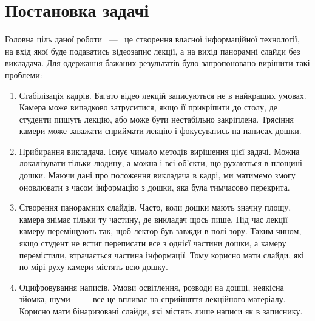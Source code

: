 \section{Постановка задачі}

Головна ціль даної роботи ~---~ це створення власної інформаційної технології,
на вхід якої буде подаватись відеозапис лекції, а на вихід панорамні слайди
без викладача.
Для одержання бажаних результатів було запропоновано
вирішити такі проблеми:
\begin{enumerate}
	\item
	      Стабілізація кадрів.
	      Багато відео лекцій записуються не в найкращих умовах.
	      Камера може випадково затруситися, якщо її прикріпити до столу,
	      де студенти пишуть лекцію, або може бути нестабільно закріплена.
	      Трясіння камери може заважати сприймати лекцію і фокусуватись на написах дошки.
	\item
	      Прибирання викладача.
	      Існує чимало методів вирішення цієї задачі. Можна локалізувати тільки
	      людину, а можна і всі об'єкти, що рухаються в площині дошки. Маючи
	      дані про положення викладача в кадрі, ми матимемо змогу оновлювати
	      з часом інформацію з дошки, яка була тимчасово перекрита.

	\item
	      Створення панорамних слайдів.
	      Часто, коли дошки мають значну площу, камера знімає тільки ту частину, де
	      викладач щось пише. Під час лекції камеру переміщують так, щоб лектор був завжди
	      в полі зору. Таким чином, якщо студент не встиг переписати все з однієї частини
	      дошки, а камеру перемістили, втрачається частина інформації. Тому корисно
	      мати слайди, які по мірі руху камери містять всю дошку.

	\item
	      Оцифровування написів.
	      Умови освітлення, розводи на дошці, неякісна зйомка, шуми ~---~ все це впливає
	      на сприйняття лекційного матеріалу. Корисно мати бінаризовані слайди,
	      які містять лише написи як в записнику.
\end{enumerate}
